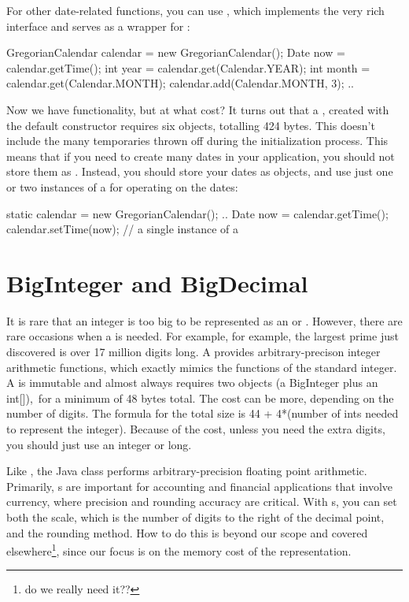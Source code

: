 For other date-related functions, you can use 
, which implements the very rich 
interface and serves as a wrapper for :
\begin{shortlisting}

	GregorianCalendar calendar = new GregorianCalendar();
    Date now = calendar.getTime();
    int year       = calendar.get(Calendar.YEAR);
	int month      = calendar.get(Calendar.MONTH); 
	calendar.add(Calendar.MONTH, 3); 
	..
    
\end{shortlisting}

Now we have functionality, but at what cost? It turns out that a
, created with the default constructor requires six
objects, totalling 424 bytes. This doesn't include the many temporaries
thrown off during the initialization process. This means that if you need to
create many dates in your application, you should not store them as
. Instead, you should store your dates as 
objects, and use just one or two instances of a  for
operating on the dates:
\begin{shortlisting}
     static calendar = new GregorianCalendar();
     ..
	 Date now = calendar.getTime();
	 calendar.setTime(now);   // a single instance of a 


\end{shortlisting}

\section{BigInteger and BigDecimal}

It is rare that an integer is too big to be represented as an  or
. However, there are rare occasions when a   is
needed. For example, for example, the largest prime
just discovered is over 17 million digits long.
A  provides 
arbitrary-precison integer arithmetic functions, which exactly mimics the
functions of the standard integer. 
A  is immutable and almost always requires two objects (a
BigInteger plus an int[]),\ for a minimum of 48 bytes total.  The cost can be more,
depending on the number of digits.  The formula for the total size is 
44 + 4*(number of ints needed to represent the integer). 
Because of the cost, unless you need the extra digits, you should just use an integer or long.

Like , the Java class  performs
arbitrary-precision floating point arithmetic. Primarily,
s are important for accounting and financial applications that
involve currency, where precision and rounding accuracy are critical. With s,
you can set both the scale, which is the number of digits to the right of the
decimal point, and the rounding method. How to do this is beyond our scope and
covered elsewhere\footnote{do we really need it??}, since our focus is on the
memory cost of the representation.

